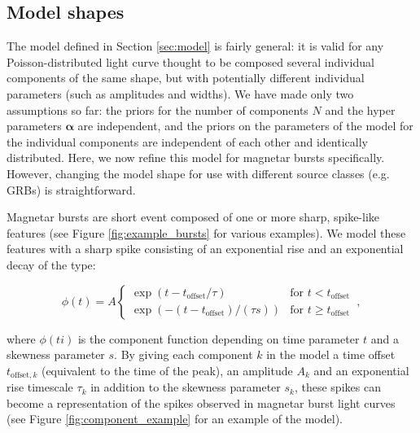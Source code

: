 \documentclass[12pt]{emulateapj}
\newcommand{\given}{\,|\,}
\newcommand{\dd}{\mathrm{d}}
\newcommand{\counts}{y}
\newcommand{\pars}{\theta}
\newcommand{\mean}{\lambda}
\newcommand{\Poisson}{{\mathcal P}}
\newcommand{\bg}{\mathrm{bg}}
\newcommand{\word}{\phi}
\begin{document}
\subsection{Model shapes}

The model defined in Section \ref{sec:model} is fairly general: it is valid for any Poisson-distributed light curve thought to be composed several individual components of
the same shape, but with potentially different individual parameters (such as amplitudes and widths). 
We have made only two assumptions so far: the priors for the number of components $N$ and the hyper parameters $\bm{\alpha}$ are independent,
and the priors on the parameters of the model for the individual components are independent of each other and identically distributed. 
Here, we now refine this model for magnetar bursts specifically. However, changing the model shape for use with different source classes (e.g. GRBs) is straightforward.

Magnetar bursts are short event composed of one or more sharp, spike-like features (see Figure \ref{fig:example_bursts} for various examples). We model these features
with a sharp spike consisting of an exponential rise and an exponential decay of the type:

\begin{equation}
\word(t) = A \left\{\begin{array}{ll}\exp(t-t_{\mathrm{offset}}/\tau) & \mbox{for $t < t_{\mathrm{offset}}$}\\ 
\exp(-(t-t_{\mathrm{offset}})/(\tau s)) & \mbox{for $t \geq t_\mathrm{offset}$}\end{array}\right. \, ,
\end{equation}

where $\word(ti)$ is the component function depending on time parameter $t$ and a skewness
parameter $s$. By giving each component $k$ in the model a time offset $t_{\mathrm{offset},k}$ (equivalent to the time of the peak), 
an amplitude $A_k$ and an exponential rise timescale $\tau_k$ in addition to the skewness parameter $s_k$, 
these spikes can become a representation of the spikes observed in magnetar burst light curves (see Figure \ref{fig:component_example}
for an example of the model).
\end{document}
